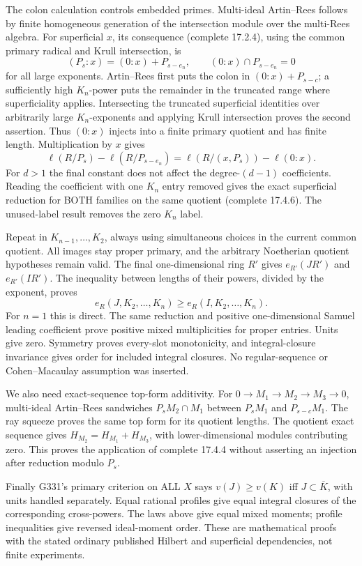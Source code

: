 The colon calculation controls embedded primes. Multi-ideal Artin--Rees follows by finite homogeneous generation of the intersection module over the multi-Rees algebra. For superficial \(x\), its consequence (complete 17.2.4), using the common primary radical and Krull intersection, is
\[
(P_s:x)=(0:x)+P_{s-e_n},\qquad (0:x)\cap P_{s-e_n}=0
\]
for all large exponents. Artin--Rees first puts the colon in \((0:x)+P_{s-c}\); a sufficiently high \(K_n\)-power puts the remainder in the truncated range where superficiality applies. Intersecting the truncated superficial identities over arbitrarily large \(K_n\)-exponents and applying Krull intersection proves the second assertion. Thus \((0:x)\) injects into a finite primary quotient and has finite length. Multiplication by \(x\) gives
\[
\ell(R/P_s)-\ell(R/P_{s-e_n})
=\ell(R/(x,P_s))-\ell(0:x).
\]
For \(d>1\) the final constant does not affect the degree-\((d-1)\) coefficients. Reading the coefficient with one \(K_n\) entry removed gives the exact superficial reduction for BOTH families on the same quotient (complete 17.4.6). The unused-label result removes the zero \(K_n\) label.

Repeat in \(K_{n-1},\ldots,K_2\), always using simultaneous choices in the current common quotient. All images stay proper primary, and the arbitrary Noetherian quotient hypotheses remain valid. The final one-dimensional ring \(R'\) gives \(e_{R'}(JR')\) and \(e_{R'}(IR')\). The inequality between lengths of their powers, divided by the exponent, proves
\[
e_R(J,K_2,\ldots,K_n)\ge e_R(I,K_2,\ldots,K_n).
\]
For \(n=1\) this is direct. The same reduction and positive one-dimensional Samuel leading coefficient prove positive mixed multiplicities for proper entries. Units give zero. Symmetry proves every-slot monotonicity, and integral-closure invariance gives order for included integral closures. No regular-sequence or Cohen--Macaulay assumption was inserted.

We also need exact-sequence top-form additivity. For \(0\to M_1\to M_2\to M_3\to0\), multi-ideal Artin--Rees sandwiches \(P_sM_2\cap M_1\) between \(P_sM_1\) and \(P_{s-c}M_1\). The ray squeeze proves the same top form for its quotient lengths. The quotient exact sequence gives \(H_{M_2}=H_{M_1}+H_{M_3}\), with lower-dimensional modules contributing zero. This proves the application of complete 17.4.4 without asserting an injection after reduction modulo \(P_s\).

Finally G331's primary criterion on ALL \(X\) says \(v(J)\ge v(K)\) iff \(J\subset\overline K\), with units handled separately. Equal rational profiles give equal integral closures of the corresponding cross-powers. The laws above give equal mixed moments; profile inequalities give reversed ideal-moment order. These are mathematical proofs with the stated ordinary published Hilbert and superficial dependencies, not finite experiments.
